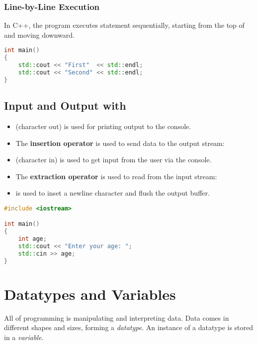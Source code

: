 \documentclass{article}
\begin{document}
\subsubsection{Line-by-Line Execution}

\noindent
In C++, the program executes statement sequentially, starting from the top of  and moving downward.

\begin{lstlisting}[language=C++]
int main()
{
	std::cout << "First"  << std::endl;
	std::cout << "Second" << std::endl;
}
\end{lstlisting}

\subsection{Input and Output with }

\begin{itemize}
	\item {} (character out) is used for printing output to the console.
	\item The \textbf{insertion operator} \inlinecpp{<<} is used to send data to the output stream:
	\item {} (character in) is used to get input from the user via the console.
	\item The \textbf{extraction operator} \inlinecpp{>>} is used to read from the input stream:
	\item {} is used to inset a newline character and flush the output buffer.
\end{itemize}

\begin{lstlisting}[language=C++]
#include <iostream>

int main()
{
	int age;	
	std::cout << "Enter your age: ";
	std::cin >> age;
}
\end{lstlisting}

\section{Datatypes and Variables}

\noindent
All of programming is manipulating and interpreting data. Data comes in different shapes and sizes, forming a \textit{datatype}. An instance of a datatype is stored in a \textit{variable}.
\end{document}
